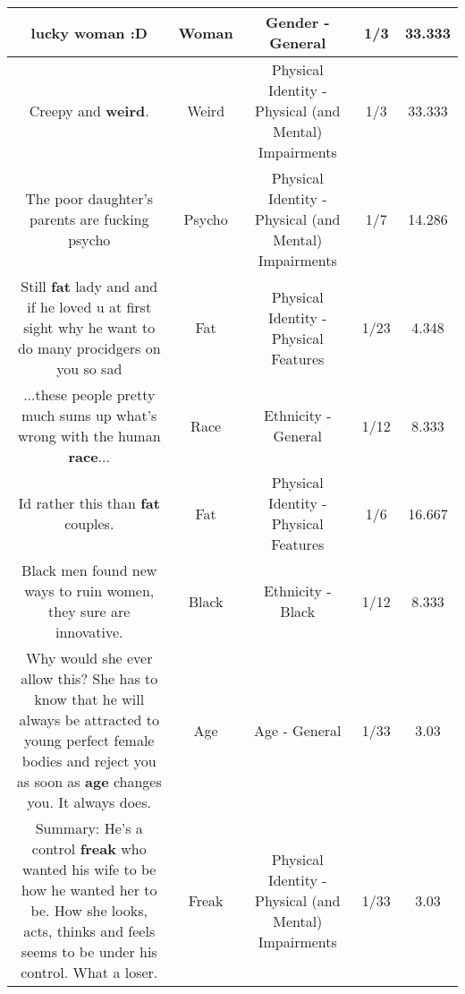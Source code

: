 \documentclass[11pt]{article}
\newlength\mylength
\begin{document}
\begin{center}
\begin{longtable}{|C{.65\mylength}|C{.30\mylength}|C{.12\mylength}|C{.12\mylength}|C{.12\mylength}|}
  \small lucky \textbf{woman} :D\normalsize   & Woman & Gender - General & 1/3 & 33.333 \\  \hline
  \small Creepy and \textbf{weird}.\normalsize   & Weird & Physical Identity - Physical (and Mental) Impairments & 1/3 & 33.333 \\  \hline
  \small The poor daughter's parents are fucking psycho\normalsize   & Psycho & Physical Identity - Physical (and Mental) Impairments & 1/7 & 14.286 \\  \hline
  \small Still \textbf{fat} lady and and if he loved u at first sight why he want to do many procidgers on you so sad\normalsize   & Fat & Physical Identity - Physical Features & 1/23 & 4.348 \\  \hline
  \small ...these people pretty much sums up what's wrong with the human \textbf{race}...\normalsize   & Race & Ethnicity - General & 1/12 & 8.333 \\  \hline
  \small Id rather this than \textbf{fat} couples.\normalsize   & Fat & Physical Identity - Physical Features & 1/6 & 16.667 \\  \hline
  \small Black men found new ways to ruin women, they sure are innovative.\normalsize   & Black & Ethnicity - Black & 1/12 & 8.333 \\  \hline
  \small Why would she ever allow this? She has to know that he will always be attracted to young perfect female bodies and reject you as soon as \textbf{age} changes you. It always does.\normalsize   & Age & Age - General & 1/33 & 3.03 \\  \hline
  \small Summary: He's a control \textbf{freak} who wanted his wife to be how he wanted her to be. How she looks, acts, thinks and feels seems to be under his control. What a loser.\normalsize   & Freak & Physical Identity - Physical (and Mental) Impairments & 1/33 & 3.03 \\  \hline

\end{longtable}
\end{center}
\end{document}
